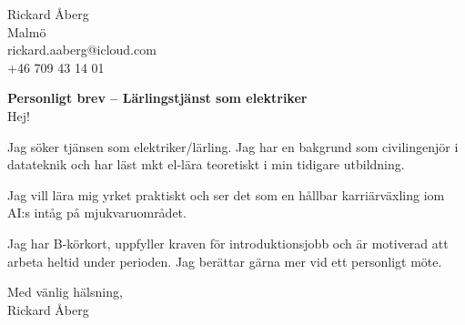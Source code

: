 \documentclass[11pt,a4paper]{article}
\begin{document}
\noindent
Rickard Åberg \\
Malmö \\
rickard.aaberg@icloud.com \\
+46 709 43 14 01 \\

\vspace{1em}

\noindent
\textbf{Personligt brev – Lärlingstjänst som elektriker} \\

\vspace{1em}
Hej!

Jag söker tjänsen som elektriker/lärling. Jag har en bakgrund som civilingenjör i datateknik och har läst mkt el-lära teoretiskt i min tidigare utbildning. 

Jag vill lära mig yrket praktiskt och ser det som en hållbar karriärväxling iom AI:s intåg på mjukvaruområdet. 


Jag har B-körkort, uppfyller kraven för introduktionsjobb och är motiverad att arbeta heltid under perioden. Jag berättar gärna mer vid ett personligt möte.

\noindent
Med vänlig hälsning, \\[1em]
Rickard Åberg
\end{document}
